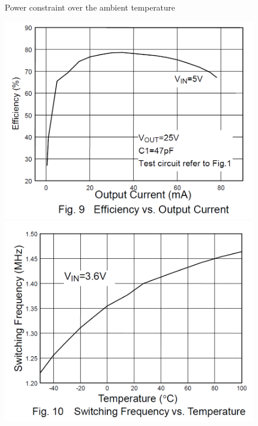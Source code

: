 \documentclass[11pt,a4paper,titlepage]{article}
\begin{document}
\begin{description}
\begin{figure}[h]
\begin{minipage}{.45\textwidth}
              \caption{Power constraint over the ambient temperature}
              \label{fig:pdmax}
            \end{minipage}
          \end{figure}

          \begin{figure}
            \begin{minipage}{.5\textwidth}
            \includegraphics[width = \textwidth]{efficiencyVScurrent.png}
            \caption{}
            \label{fig:efficiency}
            \end{minipage}
            \hspace{5mm}
            \begin{minipage}{.5\textwidth}
            \includegraphics[width = \textwidth]{frequencyVStemp.png}
            \caption{}
            \label{fig:SwFreq}
            \end{minipage}
          \end{figure}


\end{description}
\end{document}

